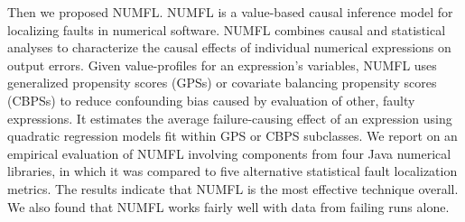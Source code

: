 Then we proposed NUMFL. NUMFL is a value-based causal inference model for localizing faults in numerical software.  NUMFL combines causal and statistical analyses to characterize the causal effects of individual numerical expressions on output errors.  Given value-profiles for an expression's variables, NUMFL uses generalized propensity scores (GPSs) or covariate balancing propensity scores (CBPSs) to reduce confounding bias caused by evaluation of other, faulty expressions.  It estimates the average failure-causing effect of an expression using quadratic regression models fit within GPS or CBPS subclasses.  We report on an empirical evaluation of NUMFL involving components from four Java numerical libraries, in which it was compared to five alternative statistical fault localization metrics.  The results indicate that NUMFL is the most effective technique overall. We also found that NUMFL works fairly well with data from failing runs alone.









